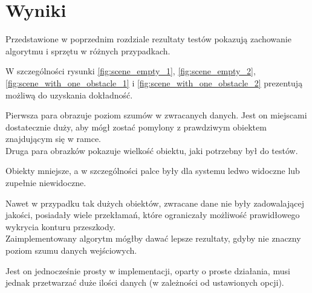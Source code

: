 \chapter{Wyniki}\label{ch:results}

Przedstawione w poprzednim rozdziale rezultaty testów pokazują zachowanie algorytmu i sprzętu w różnych przypadkach.

W szczególności rysunki \ref{fig:scene_empty_1}, \ref{fig:scene_empty_2}, \ref{fig:scene_with_one_obstacle_1} i \ref{fig:scene_with_one_obstacle_2} prezentują możliwą do uzyskania dokładność.

Pierwsza para obrazuje poziom szumów w zwracanych danych.
Jest on miejscami dostatecznie duży, aby mógł zostać pomylony z prawdziwym obiektem znajdującym się w ramce.\\

Druga para obrazków pokazuje wielkość obiektu, jaki potrzebny był do testów.

Obiekty mniejsze, a w szczególności palce były dla systemu ledwo widoczne lub zupełnie niewidoczne.

Nawet w przypadku tak dużych obiektów, zwracane dane nie były zadowalającej jakości, posiadały wiele przekłamań, które ograniczały możliwość prawidłowego wykrycia konturu przeszkody.\\

Zaimplementowany algorytm mógłby dawać lepsze rezultaty, gdyby nie znaczny poziom szumu danych wejściowych.

Jest on jednocześnie prosty w implementacji, oparty o proste działania, musi jednak przetwarzać duże ilości danych (w zależności od ustawionych opcji).

